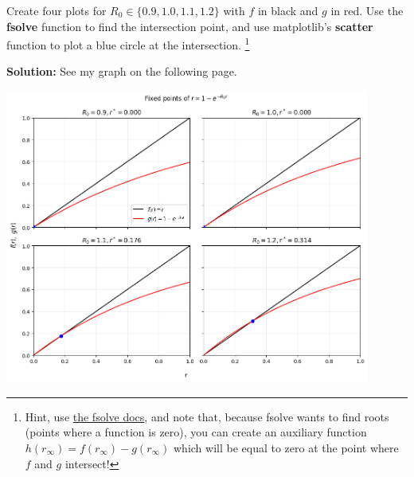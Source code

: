 \documentclass[11pt]{article}
\newenvironment{solution}{\par\noindent\begingroup\color{BrickRed}\textbf{Solution:} }{\par\endgroup}
\begin{document}
\begin{enumerate}
\begin{enumerate}[label=\alph*.]
		Create four plots for $R_0 \in \{0.9, 1.0, 1.1, 1.2\}$ with $f$ in black and $g$ in red. 
		Use the {\bf fsolve} function to find the intersection point, and use matplotlib's {\bf scatter} function to plot a blue circle at the intersection. \footnote{Hint, use \href{https://docs.scipy.org/doc/scipy/reference/generated/scipy.optimize.fsolve.html}{the fsolve docs}, 
		and note that, because fsolve wants to find roots (points where a function is zero), 
		you can create an auxiliary function $h(r_\infty) = f(r_\infty)-g(r_\infty)$ 
		which will be equal to zero at the point where $f$ and $g$ intersect!}
			\begin{solution}
				See my graph on the following page.
			\end{solution}
		\begin{center}
		  \includegraphics[width=0.9\textwidth, height=0.6\textheight, keepaspectratio]{final_size_plots.png}
		\end{center}


\end{enumerate}
\end{enumerate}
\end{document}
